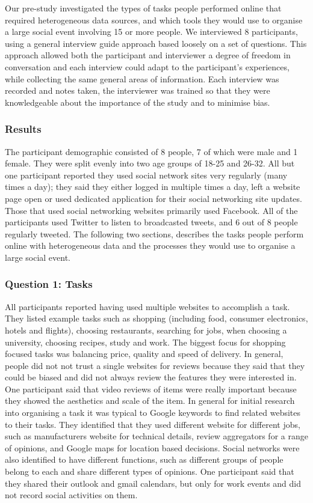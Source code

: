\documentclass{sigchi}
\begin{document}
Our pre-study investigated the types of tasks people performed online that required heterogeneous data sources, and which tools they would use to organise a large social event involving 15 or more people.  We interviewed 8 participants, using a general interview guide approach based loosely on a set of questions.  This approach allowed both the participant and interviewer a degree of freedom in conversation and each interview could adapt to the participant's experiences, while collecting the same general areas of information.  Each interview was recorded and notes taken, the interviewer was trained so that they were knowledgeable about the importance of the study and to minimise bias.

\subsubsection{Results}
The participant demographic consisted of 8 people, 7 of which were male and 1 female.  They were split evenly into two age groups of 18-25 and 26-32.  All but one participant reported they used social network sites very regularly (many times a day); they said they either logged in multiple times a day, left a website page open or used dedicated application for their social networking site updates.  Those that used social networking websites primarily used Facebook.  All of the participants used Twitter to listen to broadcasted tweets, and 6 out of 8 people regularly tweeted.  The following two sections, describes the tasks people perform online with heterogeneous data and the processes they would use to organise a large social event.

\subsubsection{Question 1: Tasks}
All participants reported having used multiple websites to accomplish a task.  They listed example tasks such as shopping (including food, consumer electronics, hotels and flights), choosing restaurants, searching for jobs, when choosing a university, choosing recipes, study and work.  The biggest focus for shopping focused tasks was balancing price, quality and speed of delivery.  In general, people did not not trust a single websites for reviews because they said that they could be biased and did not always review the features they were interested in.  One participant said that video reviews of items were really important because they showed the aesthetics and scale of the item.  In general for initial research into organising a task it was typical to Google keywords to find related websites to their tasks.  They identified that they used different website for different jobs, such as manufacturers website for technical details, review aggregators for a range of opinions, and Google maps for location based decisions.  Social networks were also identified to have different functions, such as different groups of people belong to each and share different types of opinions.  One participant said that they shared their outlook and gmail calendars, but only for work events and did not record social activities on them.
\end{document}
